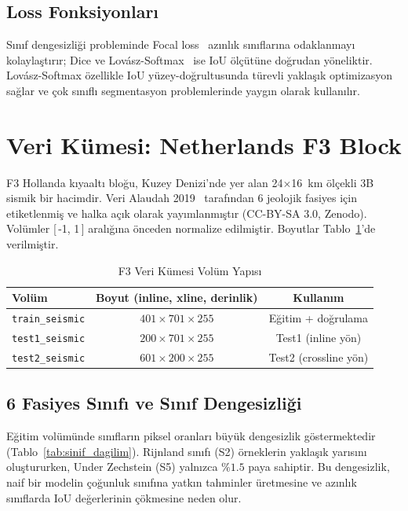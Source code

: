 \documentclass[conference,a4paper,10pt]{IEEEtran}
\begin{document}
\subsection{Loss Fonksiyonları}

Sınıf dengesizliği probleminde Focal loss~\cite{lin2017focal} azınlık sınıflarına
odaklanmayı kolaylaştırır; Dice ve Lovász-Softmax~\cite{berman2018lovasz} ise IoU
ölçütüne doğrudan yöneliktir. Lovász-Softmax özellikle IoU yüzey-doğrultusunda türevli
yaklaşık optimizasyon sağlar ve çok sınıflı segmentasyon problemlerinde yaygın olarak
kullanılır.

\section{Veri Kümesi: Netherlands F3 Block}
\label{sec:veri}

F3 Hollanda kıyaaltı bloğu, Kuzey Denizi'nde yer alan 24$\times$16~km ölçekli
3B sismik bir hacimdir. Veri Alaudah 2019~\cite{alaudah2019} tarafından
6 jeolojik fasiyes için etiketlenmiş ve halka açık olarak yayımlanmıştır
(\textsf{CC-BY-SA 3.0}, Zenodo). Volümler [\,-1, 1\,] aralığına önceden
normalize edilmiştir. Boyutlar Tablo~\ref{tab:veri_yapisi}'de verilmiştir.

\begin{table}[!t]
\renewcommand{\arraystretch}{1.2}
\caption{F3 Veri Kümesi Volüm Yapısı}
\label{tab:veri_yapisi}
\centering
\begin{tabular}{lcc}
\toprule
\textbf{Volüm} & \textbf{Boyut (inline, xline, derinlik)} & \textbf{Kullanım} \\
\midrule
\texttt{train\_seismic}  & $401 \times 701 \times 255$ & Eğitim + doğrulama \\
\texttt{test1\_seismic}  & $200 \times 701 \times 255$ & Test1 (inline yön) \\
\texttt{test2\_seismic}  & $601 \times 200 \times 255$ & Test2 (crossline yön) \\
\bottomrule
\end{tabular}
\end{table}

\subsection{6 Fasiyes Sınıfı ve Sınıf Dengesizliği}

Eğitim volümünde sınıfların piksel oranları büyük dengesizlik göstermektedir
(Tablo~\ref{tab:sinif_dagilim}). Rijnland sınıfı (S2) örneklerin yaklaşık
yarısını oluştururken, Under Zechstein (S5) yalnızca $\%1.5$ paya sahiptir.
Bu dengesizlik, naif bir modelin çoğunluk sınıfına yatkın tahminler üretmesine
ve azınlık sınıflarda IoU değerlerinin çökmesine neden olur.
\end{document}
